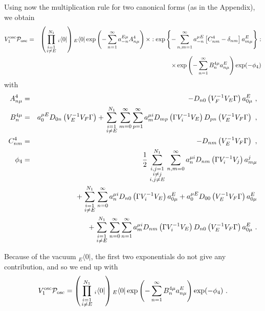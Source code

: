 \documentclass[a4paper,11pt]{article}
\begin{document}
Using now the multiplication rule for two canonical forms (as in the Appendix), we obtain
\begin{eqnarray}
V^{\rm osc}_1{\cal P}_{\rm osc} & = & \left( \prod_{\scriptstyle i=1\atop \scriptstyle i\neq E}^{N_1} { }_i\langle 0|\right) { }_E\langle 0|\exp \left( -\sum_{n=1}^\infty a^{E\mu }_{-n} A^4_{n\mu }\right) \times :\exp \left\{ -\sum_{n,m=1}^\infty a^{\mu E}_{-n} \left[ C^4_{nm}-\delta _{nm}\right] a^E_{m\mu }\right\} : \nonumber \\ 
 & & \times \exp \left( -\sum_{n=1}^\infty B^{4\mu }_na^E_{n\mu }\right) \exp (-\phi _4)
\end{eqnarray}
with
\begin{eqnarray}
A^4_{n\mu } & = & -D_{n0}\left( V^{-1}_FV_E\Gamma \right) a^E_{0\mu }\ ,\\ 
B^{4\mu }_n & = & a^{\mu E}_0D_{0n}\left( V^{-1}_EV_F\Gamma \right) +\sum_{\scriptstyle i=1\atop \scriptstyle i\neq E}^{N_1}\sum_{m=0}^\infty \sum_{p=1}^\infty a^{\mu i}_mD_{mp}\left( \Gamma V^{-1}_iV_E\right) D_{pn}\left( V^{-1}_EV_F\Gamma \right) \ ,\\ 
C^4_{nm} & = & -D_{nm}\left( V^{-1}_EV_F\Gamma \right) \ ,\\ 
\phi _4 & = & \frac{1}{2}\sum_{{\scriptstyle i,j=1\atop \scriptstyle i\neq j}\atop \scriptstyle i,j\neq E}^{N_1}\sum_{n,m=0}^\infty a^{\mu i}_nD_{nm}\left( \Gamma V^{-1}_iV_j\right) a^j_{m\mu }\nonumber \\
 & & +\sum_{\scriptstyle i=1\atop \scriptstyle i\neq E}^{N_1}\sum_{n=0}^\infty a^{\mu i}_nD_{n0}\left( \Gamma V^{-1}_iV_E\right) a^E_{0\mu }+a^{\mu E}_0D_{00}\left( V^{-1}_EV_F\Gamma \right) a^E_{0\mu }\nonumber \\ 
 & & +\sum_{\scriptstyle i=1\atop \scriptstyle i\neq E}^{N_1}\sum_{n=0}^\infty \sum_{n=1}^\infty a^{\mu i}_mD_{nm}\left( \Gamma V^{-1}_iV_E\right) D_{n0}\left( V^{-1}_EV_F\Gamma \right) a^E_{0\mu }\ .
\end{eqnarray}

Because of the vacuum ${}_E\langle 0|$, the first two exponentials do not give any contribution, and so we end up with
\begin{equation}
V^{\rm osc}_1{\cal P}_{\rm osc}=\left( \prod_{\scriptstyle i=1\atop \scriptstyle i\neq E}^{N_1}{ }_i\langle 0|\right) { }_E\langle 0|\exp \left( -\sum_{n=1}^\infty B^{4\mu }_na^E_{n\mu }\right) \exp (-\phi _4)\ .
\end{equation}
\end{document}
